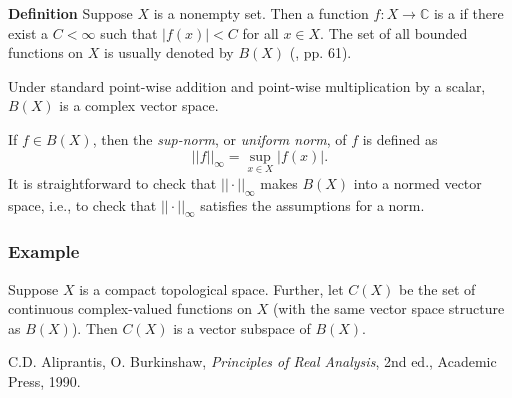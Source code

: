 \documentclass[12pt]{article}
\newcommand{\sC}[0]{\mathbb{C}}
\begin{document}
{\bf Definition} Suppose  $X$ is a nonempty set. Then a function
$f:X\to \sC$ is a \emph{} 
if there exist a $C<\infty$ such that 
$|f(x)|<C$ for all $x\in X$. The 
set of all bounded functions on $X$ is usually 
denoted by $B(X)$ (\cite{aliprantis}, pp. 61).

Under standard point-wise addition and point-wise multiplication by
a scalar, $B(X)$ is a complex vector space. 

If $f\in B(X)$, then the \emph{sup-norm}, or \emph{uniform norm}, of $f$ 
is defined as 
$$ ||f||_\infty = \sup_{x\in X} |f(x)|. $$
It is straightforward to check that $||\cdot||_\infty$ makes $B(X)$ into
a normed vector space, i.e., to check that $||\cdot||_\infty$ satisfies the 
assumptions for a norm. 

\subsubsection{Example}
Suppose $X$ is a compact topological space. Further, let $C(X)$ be the
set of continuous complex-valued functions on $X$ (with the same vector
space structure as $B(X)$). Then $C(X)$ is a vector subspace of $B(X)$. 

\begin{thebibliography}{9}
 C.D. Aliprantis, O. Burkinshaw, \emph{Principles of Real Analysis}, 
 2nd ed., Academic Press, 1990.
\end{thebibliography}
\end{document}
